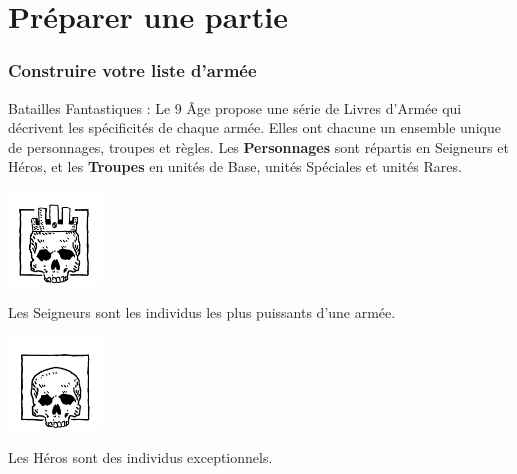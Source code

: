
\part{Préparer une partie}

\section{Construire votre liste d'armée}
\label{building_an_army}

Batailles Fantastiques : Le 9\ieme{} Âge propose une série de Livres d'Armée qui décrivent les spécificités de chaque armée. Elles ont chacune un ensemble unique de personnages, troupes et règles. Les \textbf{Personnages} sont répartis en Seigneurs et Héros, et les \textbf{Troupes} en unités de Base, unités Spéciales et unités Rares.

\noindent\hspace*{\fill} \begin{minipage}[t]{0.3\textwidth}
\begin{center}\includegraphics[width=2.5cm]{../Layout/pics/logo_lord.png}

Les Seigneurs sont les individus les plus puissants d'une armée.
\end{center}
\end{minipage}\hspace*{1cm}
\begin{minipage}[t]{0.3\textwidth}
\begin{center}\includegraphics[width=2.5cm]{../Layout/pics/logo_hero.png}

Les Héros sont des individus exceptionnels.
\end{center}
\end{minipage}\hspace*{\fill}

